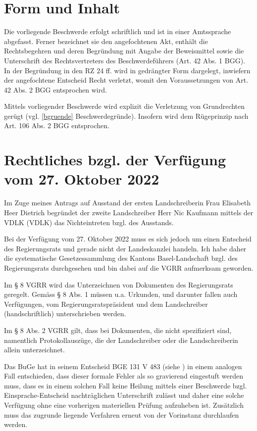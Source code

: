 \documentclass[paper=a4, onesite]{scrreprt}
\newcounter{rz}
\newcommand{\Rz}{\addtocounter{rz}{1}\marginpar{\texttt{(\textit{\arabic{rz}})}}}
\begin{document}
\section{Form und Inhalt}
\Rz Die vorliegende Beschwerde erfolgt schriftlich und ist in einer Amtssprache abgefasst. Ferner bezeichnet sie den angefochtenen Akt, enthält die Rechtsbegehren und deren Begründung mit Angabe der Beweismittel sowie die Unterschrift des Rechtsvertreters des Beschwerdeführers (Art. 42 Abs. 1 BGG). In der Begründung in den RZ 24 ff. wird in gedrängter Form dargelegt, inwiefern der angefochtene Entscheid Recht verletzt, womit den Voraussetzungen von Art. 42 Abs. 2 BGG entsprochen wird.\\

\Rz Mittels vorliegender Beschwerde wird explizit die Verletzung von Grundrechten gerügt (vgl. \ref{bgruende} Beschwerdegründe). Insofern wird dem Rügeprinzip nach Art. 106 Abs. 2 BGG entsprochen.


\section{Rechtliches bzgl. der Verfügung vom 27. Oktober 2022}\label{RechtAuszug2}
\Rz Im Zuge meines Antrags auf Ausstand der ersten Landschreiberin Frau Elisabeth Heer Dietrich begründet der zweite Landschreiber Herr Nic Kaufmann mittels der \ac{VDLK} (\ac{VDLK}) das Nichteintreten bzgl. des Ausstands.

\Rz Bei der Verfügung vom 27. Oktober 2022 muss es sich jedoch um einen Entscheid des Regierungsrats und gerade nicht der Landeskanzlei handeln. Ich habe daher die systematische Gesetzessammlung des Kantons Basel-Landschaft bzgl. des Regierungsrats durchgesehen und bin dabei auf die \ac{VGRR} aufmerksam geworden.\\

\Rz Im § 8 \ac{VGRR} wird das Unterzeichnen von Dokumenten des Regierungsrats geregelt. Gemäss § 8 Abs. 1 müssen u.a. Urkunden, und darunter fallen auch Verfügungen, vom Regierungsratspräsident und dem Landschreiber (handschriftlich) unterschrieben werden.\\

\Rz Im § 8 Abs. 2  \ac{VGRR} gilt, dass bei Dokumenten, die nicht spezifiziert sind, namentlich  Protokollauszüge, die der Landschreiber oder die Landschreiberin allein unterzeichnet.\\

\Rz Das \ac{BuGe} hat in seinem Entscheid BGE 131 V 483 (siehe \cite{BGE131V483}) in einem analogen Fall entschieden, dass dieser formale Fehler als so gravierend eingestuft werden muss, dass es in einem solchen Fall keine Heilung mittels einer Beschwerde bzgl. Einsprache-Entscheid nachträglichen Unterschrift zulässt und daher eine solche Verfügung ohne eine vorherigen materiellen Prüfung aufzuheben ist. Zusätzlich muss das zugrunde liegende Verfahren erneut von der Vorinstanz durchlaufen werden.
\end{document}
